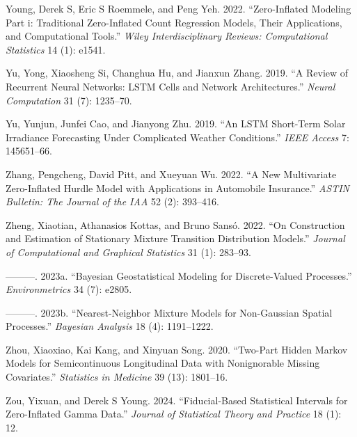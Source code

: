 \documentclass[
  letterpaper,
  double,
  12pt,
  1.0in]{beavtex}
\newlength{\cslhangindent}
\newenvironment{CSLReferences}[2] %
 {\begin{list}{}{%
  \setlength{\itemindent}{0pt}
  \setlength{\leftmargin}{0pt}
  \setlength{\parsep}{0pt}
  \ifodd #1
   \setlength{\leftmargin}{\cslhangindent}
   \setlength{\itemindent}{-1\cslhangindent}
  \fi
  \setlength{\itemsep}{#2\baselineskip}}}
 {\end{list}}
\begin{document}
\begin{CSLReferences}{1}{0}
Young, Derek S, Eric S Roemmele, and Peng Yeh. 2022. {``Zero-Inflated
Modeling Part i: Traditional Zero-Inflated Count Regression Models,
Their Applications, and Computational Tools.''} \emph{Wiley
Interdisciplinary Reviews: Computational Statistics} 14 (1): e1541.

Yu, Yong, Xiaosheng Si, Changhua Hu, and Jianxun Zhang. 2019. {``A
Review of Recurrent Neural Networks: LSTM Cells and Network
Architectures.''} \emph{Neural Computation} 31 (7): 1235--70.

Yu, Yunjun, Junfei Cao, and Jianyong Zhu. 2019. {``An LSTM Short-Term
Solar Irradiance Forecasting Under Complicated Weather Conditions.''}
\emph{IEEE Access} 7: 145651--66.

Zhang, Pengcheng, David Pitt, and Xueyuan Wu. 2022. {``A New
Multivariate Zero-Inflated Hurdle Model with Applications in Automobile
Insurance.''} \emph{ASTIN Bulletin: The Journal of the IAA} 52 (2):
393--416.

Zheng, Xiaotian, Athanasios Kottas, and Bruno Sansó. 2022. {``On
Construction and Estimation of Stationary Mixture Transition
Distribution Models.''} \emph{Journal of Computational and Graphical
Statistics} 31 (1): 283--93.

---------. 2023a. {``Bayesian Geostatistical Modeling for
Discrete-Valued Processes.''} \emph{Environmetrics} 34 (7): e2805.

---------. 2023b. {``Nearest-Neighbor Mixture Models for Non-Gaussian
Spatial Processes.''} \emph{Bayesian Analysis} 18 (4): 1191--1222.

Zhou, Xiaoxiao, Kai Kang, and Xinyuan Song. 2020. {``Two-Part Hidden
Markov Models for Semicontinuous Longitudinal Data with Nonignorable
Missing Covariates.''} \emph{Statistics in Medicine} 39 (13): 1801--16.

Zou, Yixuan, and Derek S Young. 2024. {``Fiducial-Based Statistical
Intervals for Zero-Inflated Gamma Data.''} \emph{Journal of Statistical
Theory and Practice} 18 (1): 12.

\end{CSLReferences}

\cleardoublepage
{}
{}
\appendix
\end{document}
